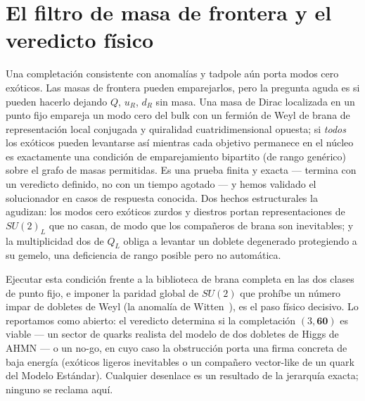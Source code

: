 \documentclass[11pt,a4paper]{article}
\begin{document}
\section{El filtro de masa de frontera y el veredicto f\'isico}\label{sec:n7}
Una completaci\'on consistente con anomal\'ias y tadpole a\'un porta modos cero ex\'oticos.
Las masas de frontera pueden emparejarlos, pero la pregunta aguda es si pueden hacerlo
dejando $Q$, $u_R$, $d_R$ sin masa. Una masa de Dirac localizada en un punto fijo empareja
un modo cero del bulk con un fermi\'on de Weyl de brana de representaci\'on local conjugada
y quiralidad cuatridimensional opuesta; si \emph{todos} los ex\'oticos pueden levantarse
as\'i mientras cada objetivo permanece en el n\'ucleo es exactamente una condici\'on de
emparejamiento bipartito (de rango gen\'erico) sobre el grafo de masas permitidas. Es una
prueba finita y exacta --- termina con un veredicto definido, no con un tiempo agotado --- y
hemos validado el solucionador en casos de respuesta conocida. Dos hechos estructurales la
agudizan: los modos cero ex\'oticos zurdos y diestros portan representaciones de $SU(2)_L$
que no casan, de modo que los compa\~neros de brana son inevitables; y la multiplicidad dos
de $Q_L$ obliga a levantar un doblete degenerado protegiendo a su gemelo, una deficiencia de
rango posible pero no autom\'atica.

Ejecutar esta condici\'on frente a la biblioteca de brana completa en las dos clases de
punto fijo, e imponer la paridad global de $SU(2)$ que proh\'ibe un n\'umero impar de
dobletes de Weyl (la anomal\'ia de Witten~\cite{Witten82}), es el paso f\'isico decisivo. Lo
reportamos como abierto: el veredicto determina si la completaci\'on $(3,\mathbf{60})$ es
viable --- un sector de quarks realista del modelo de dos dobletes de Higgs de AHMN --- o un
no-go, en cuyo caso la obstrucci\'on porta una firma concreta de baja energ\'ia (ex\'oticos
ligeros inevitables o un compa\~nero vector-like de un quark del Modelo Est\'andar). Cualquier
desenlace es un resultado de la jerarqu\'ia exacta; ninguno se reclama aqu\'i.

\end{document}

